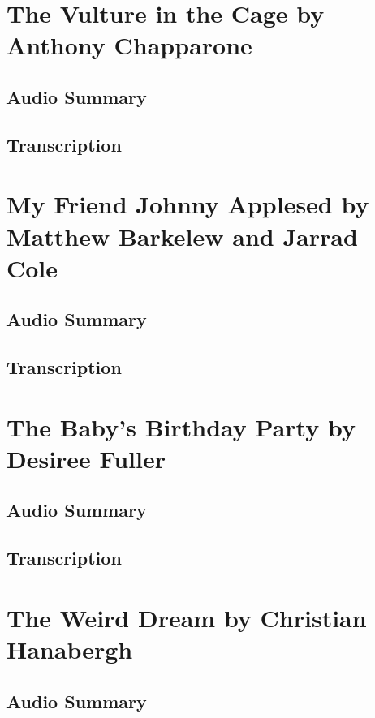 \section{The Vulture in the Cage by Anthony Chapparone}

\subsection{Audio Summary}

\subsection{Transcription}

\section{My Friend Johnny Applesed by Matthew Barkelew and Jarrad Cole}

\subsection{Audio Summary}

\subsection{Transcription}

\section{The Baby's Birthday Party by Desiree Fuller}

\subsection{Audio Summary}

\subsection{Transcription}

\section{The Weird Dream by Christian Hanabergh}

\subsection{Audio Summary}


